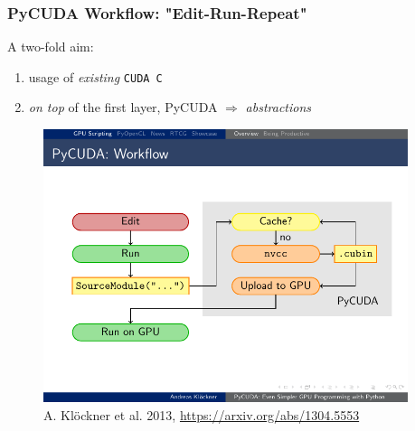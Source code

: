 \documentclass[]{beamer}
\begin{document}
\begin{frame}
\frametitle{PyCUDA Workflow: "Edit-Run-Repeat"}
A two-fold aim: 
\begin{enumerate}
    \item usage of \textit{existing} \texttt{CUDA C}
    \item \textit{on top} of the first layer, PyCUDA $\Rightarrow$ \textit{abstractions}
\end{enumerate}
\begin{figure}
    \includegraphics[width=0.95\textwidth]{pics/pycuda_workflow}
        \caption{A. Kl\"{o}ckner et al. 2013, \url{https://arxiv.org/abs/1304.5553}}
\end{figure}
\end{frame}

\end{document}
